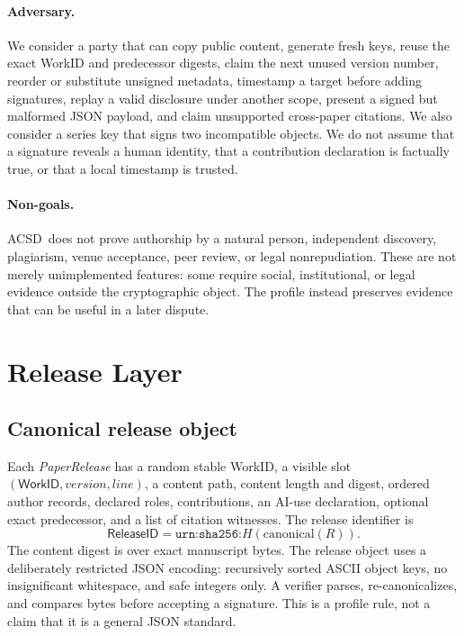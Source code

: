\documentclass[11pt]{article}
\newcommand{\workid}{\textsf{WorkID}}
\newcommand{\releaseid}{\textsf{ReleaseID}}
\newcommand{\acsd}{\textsc{ACSD}}
\begin{document}
\paragraph{Adversary.} We consider a party that can copy public content, generate fresh keys, reuse the exact WorkID and predecessor digests, claim the next unused version number, reorder or substitute unsigned metadata, timestamp a target before adding signatures, replay a valid disclosure under another scope, present a signed but malformed JSON payload, and claim unsupported cross-paper citations. We also consider a series key that signs two incompatible objects. We do not assume that a signature reveals a human identity, that a contribution declaration is factually true, or that a local timestamp is trusted.

\paragraph{Non-goals.} \acsd\ does not prove authorship by a natural person, independent discovery, plagiarism, venue acceptance, peer review, or legal nonrepudiation. These are not merely unimplemented features: some require social, institutional, or legal evidence outside the cryptographic object. The profile instead preserves evidence that can be useful in a later dispute.

\section{Release Layer}

\subsection{Canonical release object}

Each \emph{PaperRelease} has a random stable \workid, a visible slot $(\workid,\textit{version},\textit{line})$, a content path, content length and digest, ordered author records, declared roles, contributions, an AI-use declaration, optional exact predecessor, and a list of citation witnesses. The release identifier is
\[
  \releaseid = \texttt{urn:sha256:}H(\mathrm{canonical}(R)).
\]
The content digest is over exact manuscript bytes. The release object uses a deliberately restricted JSON encoding: recursively sorted ASCII object keys, no insignificant whitespace, and safe integers only. A verifier parses, re-canonicalizes, and compares bytes before accepting a signature. This is a profile rule, not a claim that it is a general JSON standard.
\end{document}
